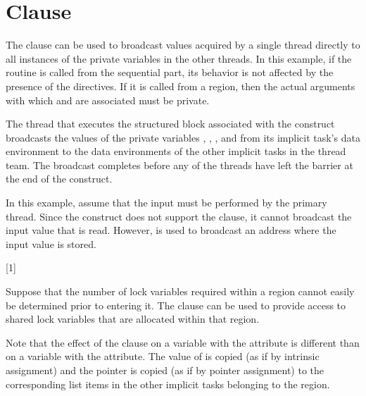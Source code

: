 \pagebreak
\section{ Clause}
\label{sec:copyprivate}

The  clause can be used to broadcast values acquired by a single 
thread directly to all instances of the private variables in the other threads. 
In this example, if the routine is called from the sequential part, its behavior 
is not affected by the presence of the directives. If it is called from a  
region, then the actual arguments with which  and  are associated 
must be private. 

The thread that executes the structured block associated with the  
 construct broadcasts the values of the private variables , , 
, and 
 from its implicit task's data environment to the data environments 
of the other implicit tasks in the thread team. The broadcast completes before 
any of the threads have left the barrier at the end of the construct.



In this example, assume that the input must be performed by the primary thread. 
Since the  construct does not support the  clause, 
it cannot broadcast the input value that is read. However,  
is used to broadcast an address where the input value is stored. 


[1]

Suppose that the number of lock variables required within a  region 
cannot easily be determined prior to entering it. The  clause 
can be used to provide access to shared lock variables that are allocated within 
that  region.


\fortranspecificstart
{}

Note that the effect of the  clause on a variable with the 
 attribute is different than on a variable with the  
attribute. The value of  is copied (as if by intrinsic assignment) and 
the pointer  is copied (as if by pointer assignment) to the corresponding 
list items in the other implicit tasks belonging to the  region. 

\fortranspecificend



